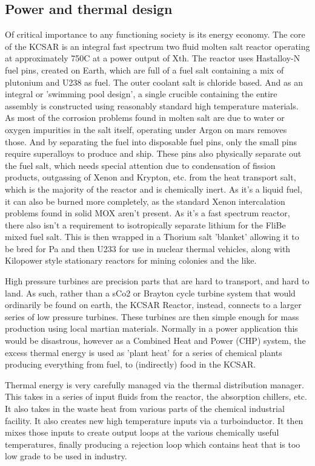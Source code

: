 \documentclass[10pt]{article}
\begin{document}
\subsection{Power and thermal design}
Of critical importance to any functioning society is its energy economy. The core of the KCSAR is an integral fast spectrum two fluid molten salt reactor operating at approximately 750C at a power output of Xth. The reactor uses Hastalloy-N fuel pins, created on Earth, which are full of a fuel salt containing a mix of plutonium and U238 as fuel. The outer coolant salt is chloride based. And as an integral or 'swimming pool design', a single crucible containing the entire assembly is constructed using reasonably standard high temperature materials. As most of the corrosion problems found in molten salt are due to water or oxygen impurities in the salt itself, operating under Argon on mars removes those. And by separating the fuel into disposable fuel pins, only the small pins require superalloys to produce and ship. These pins also physically separate out the fuel salt, which needs special attention due to condensation of fission products, outgassing of Xenon and Krypton, etc. from the heat transport salt, which is the majority of the reactor and is chemically inert. As it's a liquid fuel, it can also be burned more completely, as the standard Xenon intercalation problems found in solid MOX aren't present. As it's a fast spectrum reactor, there also isn't a requirement to isotropically separate lithium for the FliBe mixed fuel salt. This is then wrapped in a Thorium salt 'blanket' allowing it to be bred for Pa and then U233 for use in nuclear thermal vehicles, along with Kilopower style stationary reactors for mining colonies and the like.

High pressure turbines are precision parts that are hard to transport, and hard to land. As such, rather than a sCo2 or Brayton cycle turbine system that would ordinarily be found on earth, the KCSAR Reactor, instead, connects to a larger series of low pressure turbines. These turbines are then simple enough for mass production using local martian materials. Normally in a power application this would be disastrous, however as a Combined Heat and Power (CHP) system, the excess thermal energy is used as 'plant heat' for a series of chemical plants producing everything from fuel, to (indirectly) food in the KCSAR.

Thermal energy is very carefully managed via the thermal distribution manager. This takes in a series of input fluids from the reactor, the absorption chillers, etc. It also takes in the waste heat from various parts of the chemical industrial facility. It also creates new high temperature inputs via a turboinductor. It then mixes those inputs to create output loops at the various chemically useful temperatures, finally producing a rejection loop which contains heat that is too low grade to be used in industry.
\end{document}

